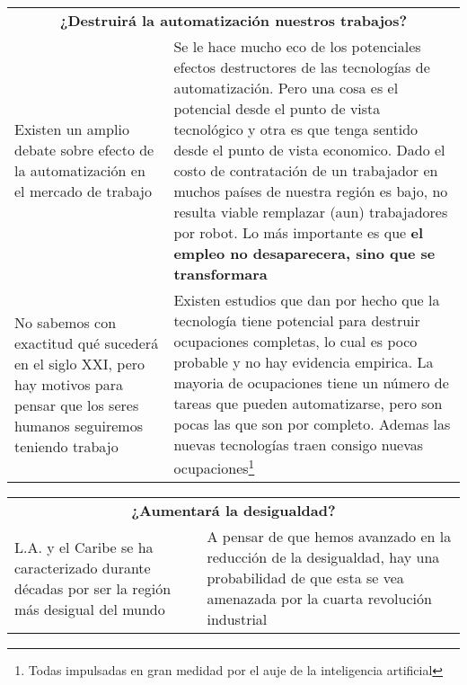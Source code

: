 \begingroup
\setlength{\tabcolsep}{12pt} %
\renewcommand{\arraystretch}{1.5} %
\begin{tabular}{p{4cm}|p{11cm}}
\multicolumn{2}{c}{\large \bf  ¿Destruirá la automatización nuestros trabajos?}\\
Existen un amplio debate sobre efecto de la automatización en el mercado de trabajo&Se le hace mucho eco de los potenciales efectos destructores de las tecnologías de automatización. Pero una cosa es el potencial desde el punto de vista tecnológico y otra es que tenga sentido desde el punto de vista economico. Dado el costo de contratación de un trabajador en muchos países de nuestra región es bajo, no resulta viable remplazar (aun) trabajadores por robot. Lo más importante es que {\bf el empleo no desaparecera, sino que se transformara}\\
No sabemos con exactitud qué sucederá en el siglo XXI, pero hay motivos para pensar que los seres humanos seguiremos teniendo trabajo&Existen estudios que dan por hecho que la tecnología tiene potencial para destruir ocupaciones completas, lo cual es poco probable y no hay evidencia empirica. La mayoria de ocupaciones tiene un número de tareas que pueden automatizarse, pero son pocas las que son por completo. Ademas las nuevas tecnologías traen consigo nuevas ocupaciones\footnote{Todas impulsadas en gran medidad por el auje de la inteligencia artificial}\\
\end{tabular}
\endgroup

\begingroup
\setlength{\tabcolsep}{12pt} %
\renewcommand{\arraystretch}{1.5} %
\begin{tabular}{p{4cm}|p{11cm}}
\multicolumn{2}{c}{\large \bf ¿Aumentará la desigualdad?}\\
L.A. y el Caribe se ha caracterizado durante décadas por ser la región más desigual del mundo& A pensar de que hemos avanzado en la reducción de la desigualdad, hay una probabilidad de que esta se vea amenazada por la cuarta revolución industrial\\    
\end{tabular}
\endgroup

